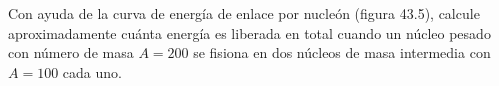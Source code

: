 \item Con ayuda de la curva de energía de enlace por nucleón (figura 43.5), calcule aproximadamente cuánta energía es liberada en total cuando un núcleo pesado con número de masa $A = 200$ se fisiona en dos núcleos de masa intermedia con $A = 100$ cada uno.